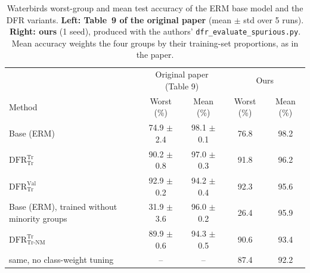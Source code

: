 \begin{table}[h]
\centering
\begin{tabular}{l cc cc}
\hline
 & \multicolumn{2}{c}{Original paper (Table 9)} & \multicolumn{2}{c}{Ours} \\
Method & Worst (\%) & Mean (\%) & Worst (\%) & Mean (\%) \\
\hline
Base (ERM) & 74.9 $\pm$ 2.4 & 98.1 $\pm$ 0.1 & 76.8 & 98.2 \\
$\mathrm{DFR}^{\mathrm{Tr}}_{\mathrm{Tr}}$ & 90.2 $\pm$ 0.8 & 97.0 $\pm$ 0.3 & 91.8 & 96.2 \\
$\mathrm{DFR}^{\mathrm{Val}}_{\mathrm{Tr}}$ & 92.9 $\pm$ 0.2 & 94.2 $\pm$ 0.4 & 92.3 & 95.6 \\
\hline
Base (ERM), trained without minority groups & 31.9 $\pm$ 3.6 & 96.0 $\pm$ 0.2 & 26.4 & 95.9 \\
$\mathrm{DFR}^{\mathrm{Tr}}_{\mathrm{Tr\text{-}NM}}$ & 89.9 $\pm$ 0.6 & 94.3 $\pm$ 0.5 & 90.6 & 93.4 \\
\quad same, no class-weight tuning & -- & -- & 87.4 & 92.2 \\
\hline
\end{tabular}
\caption{Waterbirds worst-group and mean test accuracy of the ERM base model and the DFR variants. \textbf{Left: Table~9 of the original paper} (mean $\pm$ std over 5 runs). \textbf{Right: ours} (1 seed), produced with the authors' \texttt{dfr\_evaluate\_spurious.py}. Mean accuracy weights the four groups by their training-set proportions, as in the paper.}
\label{tab:table9}
\end{table}

